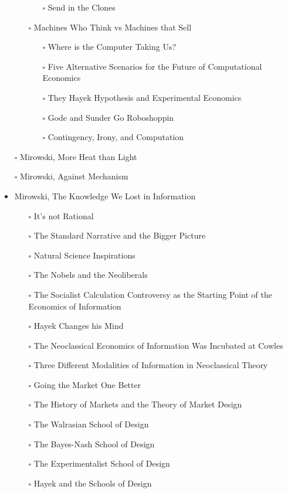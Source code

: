 \documentclass[paper=B6,portrait,twoside=true,twocolumn=false,headinclude=true,footinclude=false,fontsize=12,BCOR=10mm,DIV=calc,pagesize=auto,titlepage=firstiscover,mpinclude=false,headings=normal,headings=twolinechapter,open=right,toc=graduated,chapterprefix=false,numbers=endperiod,parskip=half+]{scrbook}
\theoremstyle{definition}
\begin{document}
\begin{itemize}
\begin{itemize}
\begin{itemize}
\item[{$\square$}] Send in the Clones
\end{itemize}
\item[{$\square$}] Machines Who Think vs Machines that Sell
\begin{itemize}
\item[{$\square$}] Where is the Computer Taking Us?
\item[{$\square$}] Five Alternative Scenarios for the Future of Computational
Economics
\item[{$\square$}] They Hayek Hypothesis and Experimental Economics
\item[{$\square$}] Gode and Sunder Go Roboshoppin
\item[{$\square$}] Contingency, Irony, and Computation
\end{itemize}
\end{itemize}
\item[{$\square$}] Mirowski, More Heat than Light
\item[{$\square$}] Mirowski, Against Mechanism
\item\relax [0/17] Mirowski, The Knowledge We Lost in Information
\begin{itemize}
\item[{$\square$}] It's not Rational
\item[{$\square$}] The Standard Narrative and the Bigger Picture
\item[{$\square$}] Natural Science Inspirations
\item[{$\square$}] The Nobels and the Neoliberals
\item[{$\square$}] The Socialist Calculation Controversy as the Starting Point of the
Economics of Information
\item[{$\square$}] Hayek Changes his Mind
\item[{$\square$}] The Neoclassical Economics of Information Was Incubated at Cowles
\item[{$\square$}] Three Different Modalities of Information in Neoclassical Theory
\item[{$\square$}] Going the Market One Better
\item[{$\square$}] The History of Markets and the Theory of Market Design
\item[{$\square$}] The Walrasian School of Design
\item[{$\square$}] The Bayes-Nash School of Design
\item[{$\square$}] The Experimentalist School of Design
\item[{$\square$}] Hayek and the Schools of Design

\end{itemize}
\end{itemize}
\end{document}
